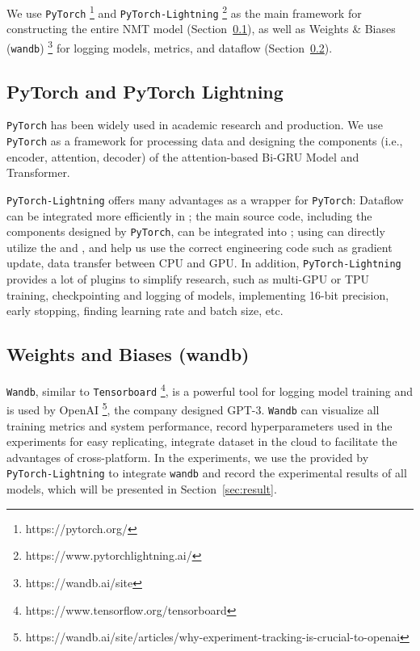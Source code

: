 We use \texttt{PyTorch} \footnote{https://pytorch.org/} and \texttt{PyTorch-Lightning} \footnote{https://www.pytorchlightning.ai/} \cite{falcon2019pytorch}  as the main framework for constructing the entire NMT model (Section~\ref{sec:lightning}), as well as Weights \& Biases (\texttt{wandb}) \footnote{https://wandb.ai/site} \cite{wandb} for logging models, metrics, and dataflow (Section~\ref{sec:wandb}).

\subsection{PyTorch and PyTorch Lightning} \label{sec:lightning}

\texttt{PyTorch} has been widely used in academic research and production. We use \texttt{PyTorch} as a framework for processing data and designing the components (i.e., encoder, attention, decoder) of the attention-based Bi-GRU Model and Transformer.

\texttt{PyTorch-Lightning} offers many advantages as a wrapper for \texttt{PyTorch}: Dataflow can be integrated more efficiently in ; the main source code, including the components designed by \texttt{PyTorch}, can be integrated into ; using  can directly utilize the  and , and help us use the correct engineering code such as gradient update, data transfer between CPU and GPU. In addition, \texttt{PyTorch-Lightning} provides a lot of plugins to simplify research, such as multi-GPU or TPU training, checkpointing and logging of models, implementing 16-bit precision, early stopping, finding learning rate and batch size, etc.

\subsection{Weights and Biases (wandb)} \label{sec:wandb}

\texttt{Wandb}, similar to \texttt{Tensorboard} \footnote{https://www.tensorflow.org/tensorboard}, is a powerful tool for logging model training and is used by OpenAI \footnote{https://wandb.ai/site/articles/why-experiment-tracking-is-crucial-to-openai}, the company designed GPT-3. \texttt{Wandb} can visualize all training metrics and system performance, record hyperparameters used in the experiments for easy replicating, integrate dataset in the cloud to facilitate the advantages of cross-platform. In the experiments, we use the  provided by \texttt{PyTorch-Lightning} to integrate \texttt{wandb} and record the experimental results of all models, which will be presented in Section~\ref{sec:result}.

